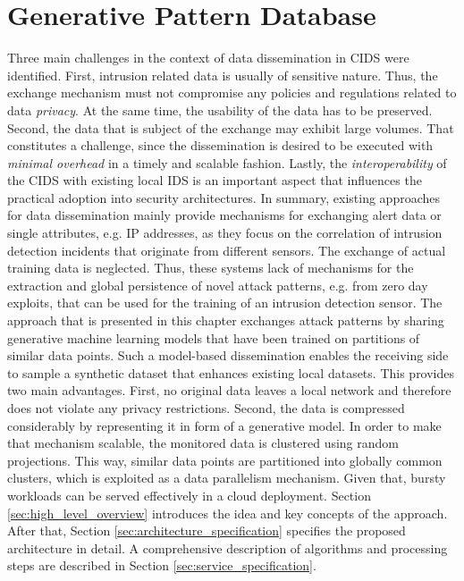 \documentclass[../../main.tex]{subfiles}
\begin{document}
\chapter{Generative Pattern Database}\label{ch:generative_pattern_database}
Three main challenges in the context of data dissemination in CIDS were identified. First, intrusion related data is usually of sensitive nature. Thus, the exchange mechanism must not compromise any policies and regulations related to data \textit{privacy}. At the same time, the usability of the data has to be preserved. Second, the data that is subject of the exchange may exhibit large volumes. That constitutes a challenge, since the dissemination is desired to be executed with \textit{minimal overhead} in a timely and scalable fashion. Lastly, the \textit{interoperability} of the CIDS with existing local IDS is an important aspect that influences the practical adoption into security architectures. In summary, existing approaches for data dissemination mainly provide mechanisms for exchanging alert data or single attributes, e.g. IP addresses, as they focus on the correlation of intrusion detection incidents that originate from different sensors. The exchange of actual training data is neglected. Thus, these systems lack of mechanisms for the extraction and global persistence of novel attack patterns, e.g. from zero day exploits, that can be used for the training of an intrusion detection sensor. The approach that is presented in this chapter exchanges attack patterns by sharing generative machine learning models that have been trained on partitions of similar data points. Such a model-based dissemination enables the receiving side to sample a synthetic dataset that enhances existing local datasets. This provides two main advantages. First, no original data leaves a local network and therefore does not violate any privacy restrictions. Second, the data is compressed considerably by representing it in form of a generative model. In order to make that mechanism scalable, the monitored data is clustered using random projections. This way, similar data points are partitioned into globally common clusters, which is exploited as a data parallelism mechanism. Given that, bursty workloads can be served effectively in a cloud deployment. Section \ref{sec:high_level_overview} introduces the idea and key concepts of the approach. After that, Section \ref{sec:architecture_specification} specifies the proposed architecture in detail. A comprehensive description of algorithms and processing steps are described in Section \ref{sec:service_specification}.
\newpage





\end{document}
